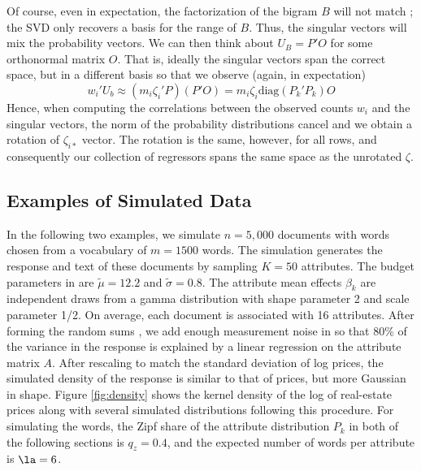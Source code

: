 \documentclass[12pt]{article}
\begin{document}
 
 Of course, even in expectation, the factorization of the bigram $B$ will not
 match  ; the SVD  only recovers a basis for the range of $B$.  Thus, the 
 singular vectors will mix the probability vectors.  We can
 then think about $U_B = P'O$ for some orthonormal matrix $O$.  That is, ideally
 the singular vectors span the correct space, but in a different basis so that
 we observe (again, in expectation)
 \begin{displaymath}
   w_i'U_b \approx (m_i \zeta_i'P)(P'O) = m_i \zeta_i \mbox{diag}(P_k'P_k) O
 \end{displaymath}
 Hence, when computing the correlations between the observed counts $w_i$ and the
 singular vectors, the norm of the probability distributions cancel and we
 obtain a rotation of  $\zeta_{i*}$ vector.  The rotation is the same, however,
 for all rows, and consequently our collection of regressors spans the same
 space as the unrotated $\zeta$.



\subsection{Examples of Simulated Data}

In the following two examples, we simulate $n = 5,000$ documents with words chosen from a vocabulary of $m = 1500$ words.  The simulation generates the response and text of these documents by sampling $K = 50$ attributes.  The budget parameters in  are $\tilde\mu = 12.2$ and $\tilde\sigma = 0.8$.  The attribute mean effects $\beta_k$ are independent draws from a gamma distribution with shape parameter 2 and scale parameter 1/2.  On average, each document is associated with 16 attributes. After forming  the random sums , we add enough measurement noise in  so that 80\% of the variance in the response is explained by a linear regression on the attribute matrix $A$.  After rescaling to match the standard deviation of log prices, the simulated density of the response is similar to that of prices, but more Gaussian in shape.  Figure \ref{fig:density} shows the kernel density of the log of real-estate prices along with several simulated distributions following this procedure.  For simulating the words, the Zipf share of the attribute distribution $P_k$ in both of the following sections is $q_z = 0.4$, and the expected number of words per attribute is $\la = 6$.  
\end{document}
